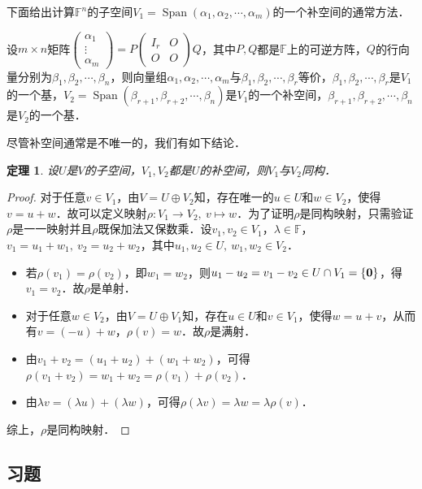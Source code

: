 \documentclass[a4paper,fontset=windows]{ctexbook}
\newtheorem{theorem}{定理}[chapter]
\theoremstyle{definition}
\DeclareMathOperator{\Span}{Span}
\begin{document}
下面给出计算$\mathbb{F}^n$的子空间$V_1=\Span(\alpha_1,\alpha_2,\cdots,\alpha_m)$的一个补空间的通常方法．

设$m\times n$矩阵$\begin{pmatrix}\alpha_1 \\ \vdots \\ \alpha_m\end{pmatrix}=P\begin{pmatrix}I_r&O \\ O&O\end{pmatrix}Q$，其中$P,Q$都是$\mathbb{F}$上的可逆方阵，$Q$的行向量分别为$\beta_1,\beta_2,\cdots,\beta_n$，则向量组$\alpha_1,\alpha_2,\cdots,\alpha_m$与$\beta_1,\beta_2,\cdots,\beta_r$等价，$\beta_1,\beta_2,\cdots,\beta_r$是$V_1$的一个基，$V_2=\Span(\beta_{r+1},\beta_{r+2},\cdots,\beta_n)$是$V_1$的一个补空间，$\beta_{r+1},\beta_{r+2},\cdots,\beta_n$是$V_2$的一个基．

\medskip 尽管补空间通常是不唯一的，我们有如下结论．

\begin{theorem}
设$U$是$V$的子空间，$V_1,V_2$都是$U$的补空间，则$V_1$与$V_2$同构．
\end{theorem}

\begin{proof}
对于任意$v\in V_1$，由$V=U\oplus V_2$知，存在唯一的$u\in U$和$w\in V_2$，使得$v=u+w$．故可以定义映射$\rho:V_1\to V_2,~v\mapsto w$．为了证明$\rho$是同构映射，只需验证$\rho$是一一映射并且$\rho$既保加法又保数乘．设$v_1,v_2\in V_1$，$\lambda\in\mathbb{F}$，$v_1=u_1+w_1,~v_2=u_2+w_2$，其中$u_1,u_2\in U,~w_1,w_2\in V_2$．
\begin{itemize}
\item 若$\rho(v_1)=\rho(v_2)$，即$w_1=w_2$，则$u_1-u_2=v_1-v_2\in U\cap V_1=\{\bf 0\}$，得$v_1=v_2$．故$\rho$是单射．

\item 对于任意$w\in V_2$，由$V=U\oplus V_1$知，存在$u\in U$和$v\in V_1$，使得$w=u+v$，从而有$v=(-u)+w$，$\rho(v)=w$．故$\rho$是满射．

\item 由$v_1+v_2=(u_1+u_2)+(w_1+w_2)$，可得$\rho(v_1+v_2)=w_1+w_2=\rho(v_1)+\rho(v_2)$．

\item 由$\lambda v=(\lambda u)+(\lambda w)$，可得$\rho(\lambda v)=\lambda w=\lambda\rho(v)$．
\end{itemize}
综上，$\rho$是同构映射．
\end{proof}

\subsection*{习题}
\end{document}
